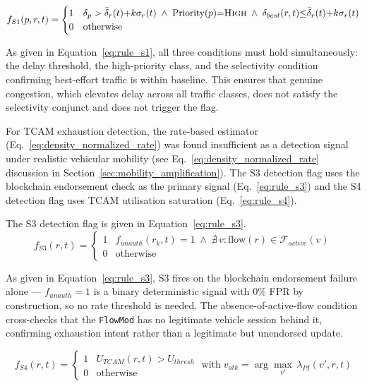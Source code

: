 \documentclass[12pt, a4paper]{report}
\begin{document}
\begin{equation}
f_{S1}(p,r,t) =
\begin{cases}
1 & \delta_p > \bar{\delta}_r(t){+}k\sigma_r(t)
    \;\land\; \text{Priority}(p){=}\textsc{High}
    \;\land\; \delta_{best}(r,t){\leq}
    \bar{\delta}_r(t){+}k\sigma_r(t) \\
0 & \text{otherwise}
\end{cases}
\label{eq:rule_s1}
\end{equation}

As given in Equation~\eqref{eq:rule_s1}, all three
conditions must hold simultaneously: the delay
threshold, the high-priority class, and the selectivity
condition confirming best-effort traffic is within
baseline. This ensures that genuine congestion, which
elevates delay across all traffic classes, does not
satisfy the selectivity conjunct and does not trigger
the flag.

For \ac{TCAM} exhaustion detection, the rate-based
estimator (Eq.~\ref{eq:density_normalized_rate}) was
found insufficient as a detection signal under
realistic vehicular mobility (see
Eq.~\ref{eq:density_normalized_rate} discussion in
Section~\ref{sec:mobility_amplification}). The S3
detection flag uses the blockchain endorsement check
as the primary signal
(Eq.~\ref{eq:rule_s3}) and the S4 detection flag
uses \ac{TCAM} utilisation saturation
(Eq.~\ref{eq:rule_s4}).

The S3 detection flag is given in
Equation~\eqref{eq:rule_s3}.
\begin{equation}
f_{S3}(r,t) =
\begin{cases}
1 & f_{unauth}(r_k,t) = 1
    \;\land\; \nexists\,v :
    \text{flow}(r) \in \mathcal{F}_{active}(v) \\
0 & \text{otherwise}
\end{cases}
\label{eq:rule_s3}
\end{equation}

As given in Equation~\eqref{eq:rule_s3}, S3 fires on
the blockchain endorsement failure alone ---
$f_{unauth}{=}1$ is a binary deterministic signal with
0\% \ac{FPR} by construction, so no rate threshold is
needed. The absence-of-active-flow condition cross-checks
that the \texttt{FlowMod} has no legitimate vehicle
session behind it, confirming exhaustion intent rather
than a legitimate but unendorsed update.


\begin{equation}
f_{S4}(r,t) =
\begin{cases}
1 & U_{TCAM}(r,t) > U_{thresh} \\
0 & \text{otherwise}
\end{cases}
\;\text{with}\;
v_{atk} = \arg\max_{v'}\,\lambda_{PI}(v',r,t)
\label{eq:rule_s4}
\end{equation}
\end{document}
